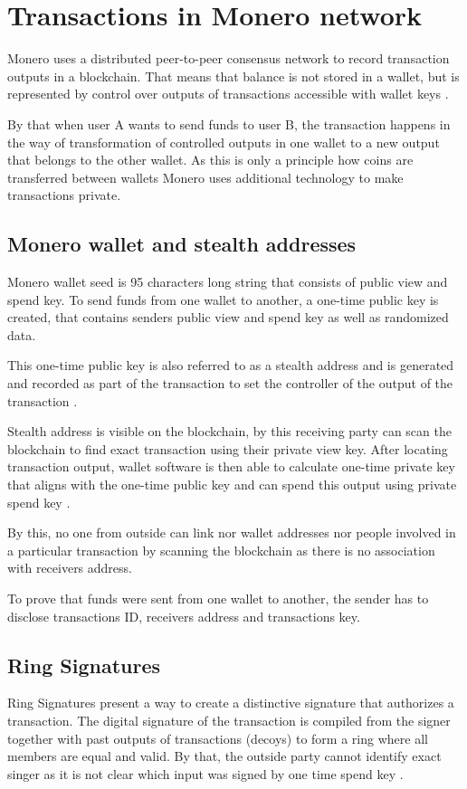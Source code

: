 \documentclass[
  printed, %
  table,   %
  nolof,     %
  nolot,     %
           oneside, color
]{fithesis3}
\begin{document}
\section{Transactions in Monero network}
Monero uses a distributed peer-to-peer consensus network to record transaction outputs in a blockchain. That means that balance is not stored in a wallet, but is represented by control over outputs of transactions accessible with wallet keys \cite{seguias2018moneroa}.

By that when user A wants to send funds to user B, the transaction happens in the way of transformation of controlled outputs in one wallet to a new output that belongs to the other wallet. As this is only a principle how coins are transferred between wallets Monero uses additional technology to make transactions private.
\subsection{Monero wallet and stealth addresses}
\label{sec:stealthaddresses}
Monero wallet seed is 95 characters long string that consists of public view and spend key. To send funds from one wallet to another, a one-time public key is created, that contains senders public view and spend key as well as randomized data. 

This one-time public key is also referred to as a stealth address and is generated and recorded as part of the transaction to set the controller of the output of the transaction \cite{seguias2018monero}.

Stealth address is visible on the blockchain, by this receiving party can scan the blockchain to find exact transaction using their private view key. After locating transaction output, wallet software is then able to calculate one-time private key that aligns with the one-time public key and can spend this output using private spend key \cite{courtois2017stealth}.

By this, no one from outside can link nor wallet addresses nor people involved in a particular transaction by scanning the blockchain as there is no association with receivers address.

To prove that funds were sent from one wallet to another, the sender has to disclose transactions ID, receivers address and transactions key.

\subsection{Ring Signatures}
\label{sec:ringsignatures}
Ring Signatures present a way to create a distinctive signature that authorizes a transaction. The digital signature of the transaction is compiled from the signer together with past outputs of transactions (decoys) to form a ring where all members are equal and valid. By that, the outside party cannot identify exact singer as it is not clear which input was signed by one time spend key \cite{mercer2016privacy}.
\end{document}
